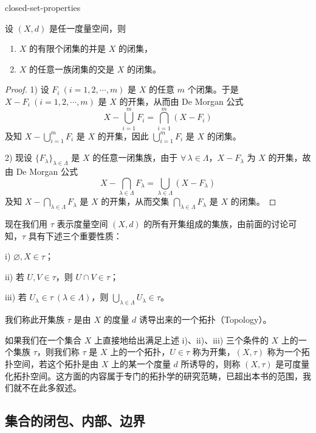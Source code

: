 \begin{mythm}{}{closed-set-properties}

设 $(X,d)$ 是任一度量空间，则
\begin{enumerate}[label=\arabic{enumi})]
\item $X$ 的有限个闭集的并是 $X$ 的闭集，
\item $X$ 的任意一族闭集的交是 $X$ 的闭集。
\end{enumerate}

\end{mythm}

\begin{proof}

1) 设 $F_i\ (i=1,2,\cdots,m)$ 是 $X$ 的任意 $m$ 个闭集。于是 $X-F_i\ (i=1,2,\cdots,m)$ 是 $X$ 的开集，从而由 De Morgan 公式
\[X-\bigcup_{i=1}^{m}F_i=\bigcap_{i=1}^{m}(X-F_i)\]
及知 $X-\displaystyle\bigcup_{i=1}^{m}F_i$ 是 $X$ 的开集，因此 $\displaystyle\bigcup_{i=1}^{m}F_i$ 是 $X$ 的闭集。

2) 现设 $\{F_{\lambda}\}_{\lambda\in\Lambda}$ 是 $X$ 的任意一闭集族，由于 $\forall\,\lambda\in\Lambda$，$X-F_{\lambda}$ 为 $X$ 的开集，故由 De Morgan 公式
\[X-\bigcap_{\lambda\in\Lambda}F_{\lambda}=\bigcup_{\lambda\in\Lambda}(X-F_{\lambda})\]
及知 $X-\displaystyle\bigcap_{\lambda\in\Lambda}F_{\lambda}$ 是 $X$ 的开集，从而交集 $\displaystyle\bigcap_{\lambda\in\Lambda}F_{\lambda}$ 是 $X$ 的闭集。

\end{proof}

现在我们用 $\tau$ 表示度量空间 $(X,d)$ 的所有开集组成的集族，由前面的讨论可知，$\tau$ 具有下述三个重要性质：

i) $\varnothing,X\in\tau$；

ii) 若 $U,V\in\tau$，则 $U\cap V\in\tau$；

iii) 若 $U_{\lambda}\in\tau\ (\lambda\in\Lambda)$，则 $\displaystyle\bigcup_{\lambda\in\Lambda}U_{\lambda}\in\tau$。

我们称此开集族 $\tau$ 是由 $X$ 的度量 $d$ 诱导出来的一个拓扑（Topology）。

如果我们在一个集合 $X$ 上直接地给出满足上述 i)、ii)、iii) 三个条件的 $X$ 上的一个集族 $\tau$，则我们称 $\tau$ 是 $X$ 上的一个拓扑，$U\in\tau$ 称为开集，$(X,\tau)$ 称为一个拓扑空间，若这个拓扑是由 $X$ 上的某一个度量 $d$ 所诱导的，则称 $(X,\tau)$ 是可度量化拓扑空间。这方面的内容属于专门的拓扑学的研究范畴，已超出本书的范围，我们就不在此多叙述。

\subsection{集合的闭包、内部、边界}
	\label{sec:10-2-3}

